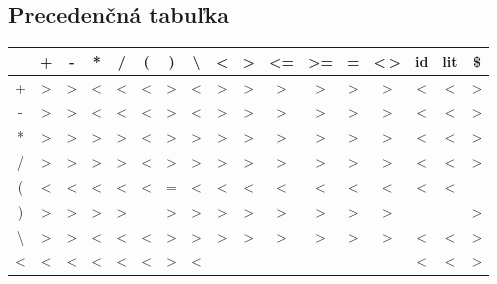 \documentclass[11pt,a4paper]{article}
\begin{document}
	\subsection{Precedenčná tabuľka}
	\begin{center}
	\begin{LARGE}
	\begin{tabular}{|c||c|c|c|c|c|c|c|c|c|c|c|c|c|c|c|c|}
	\hline
	\rowcolor{green}
	&+&-&*&/&(&)&\textbackslash&<&>&<=&>=&=&<\,>&id&lit&\$\\
	\hline
	\hline
	\cellcolor{green}+&\color{red}>&\color{red}>&\color{blue}<&\color{blue}<&\color{blue}<&\color{red}>&\color{blue}<&\color{red}>&\color{red}>&\color{red}>&\color{red}>&\color{red}>&\color{red}>&\color{blue}<&\color{blue}<&\color{red}>\\
	\hline
	\cellcolor{green}-&\color{red}>&\color{red}>&\color{blue}<&\color{blue}<&\color{blue}<&\color{red}>&\color{blue}<&\color{red}>&\color{red}>&\color{red}>&\color{red}>&\color{red}>&\color{red}>&\color{blue}<&\color{blue}<&\color{red}>\\
	\hline
	\cellcolor{green}*&\color{red}>&\color{red}>&\color{red}>&\color{red}>&\color{blue}<&\color{red}>&\color{red}>&\color{red}>&\color{red}>&\color{red}>&\color{red}>&\color{red}>&\color{red}>&\color{blue}<&\color{blue}<&\color{red}>\\
	\hline
	\cellcolor{green}/&\color{red}>&\color{red}>&\color{red}>&\color{red}>&\color{blue}<&\color{red}>&\color{red}>&\color{red}>&\color{red}>&\color{red}>&\color{red}>&\color{red}>&\color{red}>&\color{blue}<&\color{blue}<&\color{red}>\\
	\hline
	\cellcolor{green}(&\color{blue}<&\color{blue}<&\color{blue}<&\color{blue}<&\color{blue}<&\color{green}=&\color{blue}<&\color{blue}<&\color{blue}<&\color{blue}<&\color{blue}<&\color{blue}<&\color{blue}<&\color{blue}<&\color{blue}<&\\
	\hline
	\cellcolor{green})&\color{red}>&\color{red}>&\color{red}>&\color{red}>&&\color{red}>&\color{red}>&\color{red}>&\color{red}>&\color{red}>&\color{red}>&\color{red}>&\color{red}>&&&\color{red}>\\
	\hline
	\cellcolor{green}\textbackslash&\color{red}>&\color{red}>&\color{blue}<&\color{blue}<&\color{blue}<&\color{red}>&\color{red}>&\color{red}>&\color{red}>&\color{red}>&\color{red}>&\color{red}>&\color{red}>&\color{blue}<&\color{blue}<&\color{red}>\\
	\hline
	\cellcolor{green}<&\color{blue}<&\color{blue}<&\color{blue}<&\color{blue}<&\color{blue}<&\color{red}>&\color{blue}<&&&&&&&\color{blue}<&\color{blue}<&\color{red}>\\

\end{tabular}
\end{LARGE}
\end{center}
\end{document}
